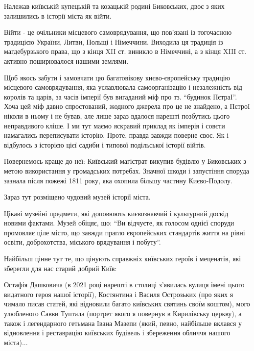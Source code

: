 Належав київській купецькій та козацькій родині Биковських, двоє з яких
залишились в історії міста як війти. 

Війти - це очільники місцевого самоврядування, що пов’язані із тогочасною
традицією України, Литви, Польщі і Німеччини. Виходила ця традиція із
магдебурзького права, що з кінця XII ст. виникло в Німеччині, а з кінця XIII
ст. активно поширювалося нашими землями.

Щоб якось забути і замовчати цю багатовікову києво-європейську традицію
місцевого самоврядування, яка уславлювала самоорганізацію і незалежність від
королів та царів, за часів імперії був вигаданий міф про тз. “будинок ПєтраІ”.
Хоча цей міф давно спростований, жодного джерела про це не знайдено, а ПєтроІ
ніколи в ньому і не бував, але лише зараз вдалося нарешті позбутись цього
неправдивого кліше. І ми тут маємо яскравий приклад як імперія і совєти
намагались переписувати історію. Проте, правда завжди поверне своє. Як і
відбулось з історією цієї садиби і типової подільської історії війтів. 

Повернемось краще до неї: Київський магістрат викупив будівлю у Биковських з
метою використання у громадських потребах. Значної шкоди і запустіння споруда
зазнала після пожежі 1811 року, яка охопила більшу частину Києво-Подолу.  

Зараз тут розміщено чудовий музей історії міста. 

Цікаві музейні предмети, які доповюють києвознавчий і культурний досвід новими
фактами. Музей обіцяє, що: \enquote{Ви відчуєте, як голосом однієї споруди промовляє
ціле місто, що завжди прагло європейських стандартів життя на рівні освіти,
доброхотства, міського врядування і побуту}. 

Найбільш цінне тут те, що цінують справжніх київських героїв і меценатів, які
зберегли для нас старий добрий Київ: 

Остафія Дашковича (в 2021 році нарешті в столиці з’явилась вулиця імені цього
видатного героя нашої історії), Костянтина і Василя Острозьких (про яких я
чимало писав статей, які відновили багато київських святинь своїм коштом), мого
улюбленого Савви Туптала (портрет якого я повернув в Кирилівську церкву), а
також і легендарного гетьмана Івана Мазепи (який, певно, найбільше вклався у
відновлення і реставрацію київських будівель і збереження обличчя нашого
міста)...

